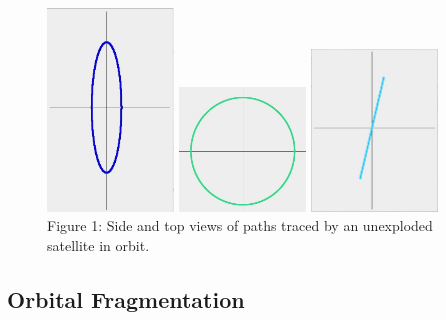 \documentclass[12pt]{scrartcl}
\begin{document}
\begin{figure}
\begin{center}
\label{fig:unexploded_sat_orbit}
\includegraphics[width=0.3\textwidth]{side_regular_orbit_1.jpg}
\includegraphics[width=0.3\textwidth]{side_regular_orbit_2.jpg}
\includegraphics[width=0.3\textwidth]{top_regular_orbit.jpg}\\
Figure 1: Side and top views of paths traced by an unexploded satellite in orbit.

\end{center}
\end{figure}

\subsection{Orbital Fragmentation}
\end{document}

